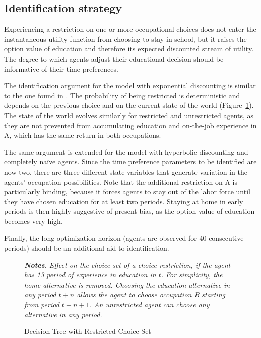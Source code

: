 \subsection{Identification strategy} \label{identification-strategy}

Experiencing a restriction on one or more occupational choices does not enter the instantaneous utility function from choosing to stay in school, but it raises the option value of education and therefore its expected discounted stream of utility. The degree to which agents adjust their educational decision should be informative of their time preferences.

The identification argument for the model with exponential discounting is similar to the one found in \textcite{Schneider2020}. The probability of being restricted is deterministic and depends on the previous choice and on the current state of the world (Figure~\ref{fig:restricted-choice-set}). The state of the world evolves similarly for restricted and unrestricted agents, as they are not prevented from accumulating education and on-the-job experience in A, which has the same return in both occupations. 

The same argument is extended for the model with hyperbolic discounting and completely naïve agents. Since the time preference parameters to be identified are now two, there are three different state variables that generate variation in the agents' occupation possibilities. 
Note that the additional restriction on A is particularly binding, because it forces agents to stay out of the labor force until they have chosen education for at least two periods. Staying at home in early periods is then highly suggestive of present bias, as the option value of education becomes very high. 

Finally, the long optimization horizon (agents are observed for 40 consecutive periods) should be an additional aid to identification. 

\begin{figure}
\caption{Decision Tree with Restricted Choice Set}
\centering
\resizebox{0.95\textwidth}{!}{%
}
\label{fig:restricted-choice-set}
\justify
\footnotesize
\textit{\textbf{Notes}. Effect on the choice set of a choice restriction, if the agent has 13 period of experience in education in $t$. For simplicity, the home alternative is removed. Choosing the education alternative in any period $t+n$ allows the agent to choose occupation B starting from period $t+n+1$. An unrestricted agent can choose any alternative in any period.}
\end{figure}

